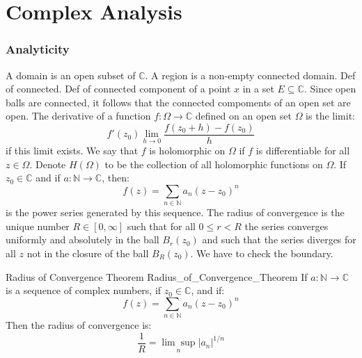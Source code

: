 \documentclass[crop=false,class=article]{standalone}                           %
\begin{document}
    \part{Complex Analysis}
    \section{Analyticity}
        A domain is an open subset of $\mathbb{C}$. A region is a non-empty
        connected domain. Def of connected. Def of connected component of a
        point $x$ in a set $E\subseteq\mathbb{C}$. Since open balls are
        connected, it follows that the connected compoments of an open set are
        open. The derivative of a function $f:\Omega\rightarrow\mathbb{C}$
        defined on an open set $\Omega$ is the limit:
        \begin{equation}
            f'(z_{0})\underset{h\rightarrow{0}}{\lim}
                \frac{f(z_{0}+h)-f(z_{0})}{h}
        \end{equation}
        if this limit exists. We say that $f$ is holomorphic on $\Omega$ if $f$
        is differentiable for all $z\in\Omega$. Denote $H(\Omega)$ to be the
        collection of all holomorphic functions on $\Omega$. If
        $z_{0}\in\mathbb{C}$ and if $a:\mathbb{N}\rightarrow\mathbb{C}$, then:
        \begin{equation}
            f(z)=\sum_{n\in\mathbb{N}}a_{n}(z-z_{0})^{n}
        \end{equation}
        is the power series generated by this sequence. The radius of
        convergence is the unique number $R\in[0,\infty]$ such that for all
        $0\leq{r}<R$ the series converges uniformly and absolutely in the ball
        $B_{r}(z_{0})$ and such that the series diverges for all $z$ not in the
        closure of the ball $B_{R}(z_{0})$. We have to check the boundary.
        \begin{ftheorem}{Radius of Convergence Theorem}
                        {Radius_of_Convergence_Theorem}
            If $a:\mathbb{N}\rightarrow\mathbb{C}$ is a sequence of complex
            numbers, if $z_{0}\in\mathbb{C}$, and if:
            \begin{equation}
                f(z)=\sum_{n\in\mathbb{N}}a_{n}(z-z_{0})^{n}
            \end{equation}
            Then the radius of convergence is:
            \begin{equation}
                \frac{1}{R}=\underset{n}{\lim\sup}|a_{n}|^{1/n}
            \end{equation}
        \end{ftheorem}
\end{document}
